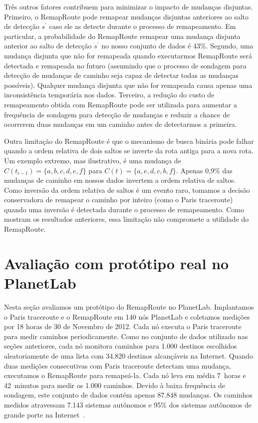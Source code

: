 \documentclass{JBCS}
\newcommand{\rmprt}{{Re\-map\-Rou\-te}}
\begin{document}
Três outros fatores contribuem para minimizar o impacto de mudanças
disjuntas.  Primeiro, o \rmprt{} pode remapear mudanças disjuntas
anteriores ao salto de detecção $s^\prime$ caso ele as detecte durante o
processo de remapeamento.  Em particular, a probabilidade do \rmprt{}
remapear uma mudança disjunta anterior ao salto de detecção $s^\prime$
no nosso conjunto de dados é 43\%.  Segundo, uma mudança disjunta que
não for remapeada quando executarmos \rmprt{} será detectada e remapeada
no futuro (assumindo que o processo de sondagem para detecção de
mudanças de caminho seja capaz de detectar todas as mudanças possíveis).
Qualquer mudança disjunta que não for remapeada causa apenas uma
inconsistência temporária nos dados.  Terceiro, a redução do custo de
remapeamento obtida com \rmprt{} pode ser utilizada para aumentar a
frequência de sondagem para detecção de mudanças e reduzir a chance de
ocorrerem duas mudanças em um caminho antes de detectarmos a primeira.

Outra limitação do \rmprt{} é que o mecanismo de busca binária pode
falhar quando a ordem relativa de dois saltos se inverte da rota antiga
para a nova rota.  Um exemplo extremo, mas ilustrativo, é uma mudança de
$C(t_{i-1}) = \{a, b, c, d, e, f\}$ para $C(t) = \{a, e, d, c, b, f\}$.
Apenas 0,9\% das mudanças de caminho em nossos dados invertem a ordem
relativa de saltos.  Como inversão da ordem relativa de saltos é um
evento raro, tomamos a decisão conservadora de remapear o caminho por
inteiro (como o Paris traceroute) quando uma inversão é detectada
durante o processo de remapeamento.  Como mostram os resultados
anteriores, essa limitação não compromete a utilidade do \rmprt{}.

\section{Avaliação com protótipo real no PlanetLab}
\label{sec:deploy}

Nesta seção avaliamos um protótipo do \rmprt{} no PlanetLab.
Implantamos o Paris traceroute e o \rmprt{} em 140 nós PlanetLab e
coletamos medições por 18 horas de 30 de Novembro de 2012.  Cada nó
executa o Paris traceroute para medir caminhos periodicamente.  Como no
conjunto de dados utilizado nas seções anteriores, cada nó monitora
caminhos para 1.000 destinos escolhidos aleatoriamente de uma lista com
34.820 destinos alcançáveis na Internet.  Quando duas medições
consecutivas com Paris traceroute detectam uma mudança, executamos o
\rmprt{} para remapeá-la.  Cada nó leva em média 7~horas e 42~minutos
para medir os 1.000 caminhos.  Devido à baixa frequência de sondagem,
este conjunto de dados contém apenas 87.848 mudanças.  Os caminhos
medidos atravessam 7.143 sistemas autônomos e 95\% dos sistemas
autônomos de grande porte na Internet~\cite{oliveira08as2tier}.
\end{document}
